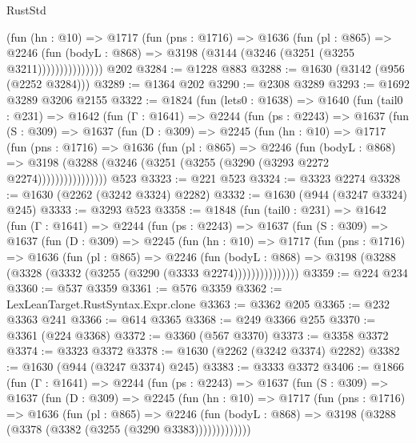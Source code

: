 \begin{lexlean}{RustStd}
\begin{coremodule}
                  (fun (hn : @10) =>
                  @1717
                    (fun (pns : @1716) =>
                    @1636
                      (fun (pl : @865) =>
                      @2246
                        (fun (bodyL : @868) =>
                        @3198 (@3144 (@3246 (@3251 (@3255 @3211)))))))))))))))
    @202
@3284 := @1228 @883
@3288 := @1630 (@3142 (@956 (@2252 @3284)))
@3289 := @1364 @202
@3290 := @2308 @3289
@3293 := @1692 @3289 @3206 @2155
@3322 := @1824
    (fun (lets0 : @1638) =>
    @1640
      (fun (tail0 : @231) =>
      @1642
        (fun (Γ : @1641) =>
        @2244
          (fun (ps : @2243) =>
          @1637
            (fun (S : @309) =>
            @1637
              (fun (D : @309) =>
              @2245
                (fun (hn : @10) =>
                @1717
                  (fun (pns : @1716) =>
                  @1636
                    (fun (pl : @865) =>
                    @2246
                      (fun (bodyL : @868) =>
                      @3198 (@3288 (@3246 (@3251 (@3255 (@3290 (@3293 @2272 @2274))))))))))))))))
    @523
@3323 := @221 @523
@3324 := @3323 @2274
@3328 := @1630 (@2262 (@3242 @3324) @2282)
@3332 := @1630 (@944 (@3247 @3324) @245)
@3333 := @3293 @523
@3358 := @1848
    (fun (tail0 : @231) =>
    @1642
      (fun (Γ : @1641) =>
      @2244
        (fun (ps : @2243) =>
        @1637
          (fun (S : @309) =>
          @1637
            (fun (D : @309) =>
            @2245
              (fun (hn : @10) =>
              @1717
                (fun (pns : @1716) =>
                @1636
                  (fun (pl : @865) =>
                  @2246
                    (fun (bodyL : @868) =>
                    @3198 (@3288 (@3328 (@3332 (@3255 (@3290 (@3333 @2274)))))))))))))))
@3359 := @224 @234
@3360 := @537 @3359
@3361 := @576 @3359
@3362 := LexLeanTarget.RustSyntax.Expr.clone
@3363 := @3362 @205
@3365 := @232 @3363 @241
@3366 := @614 @3365
@3368 := @249 @3366 @255
@3370 := @3361 (@224 @3368)
@3372 := @3360 (@567 @3370)
@3373 := @3358 @3372
@3374 := @3323 @3372
@3378 := @1630 (@2262 (@3242 @3374) @2282)
@3382 := @1630 (@944 (@3247 @3374) @245)
@3383 := @3333 @3372
@3406 := @1866
    (fun (Γ : @1641) =>
    @2244
      (fun (ps : @2243) =>
      @1637
        (fun (S : @309) =>
        @1637
          (fun (D : @309) =>
          @2245
            (fun (hn : @10) =>
            @1717
              (fun (pns : @1716) =>
              @1636
                (fun (pl : @865) =>
                @2246
                  (fun (bodyL : @868) => @3198 (@3288 (@3378 (@3382 (@3255 (@3290 @3383)))))))))))))

\end{coremodule}
\end{lexlean}
